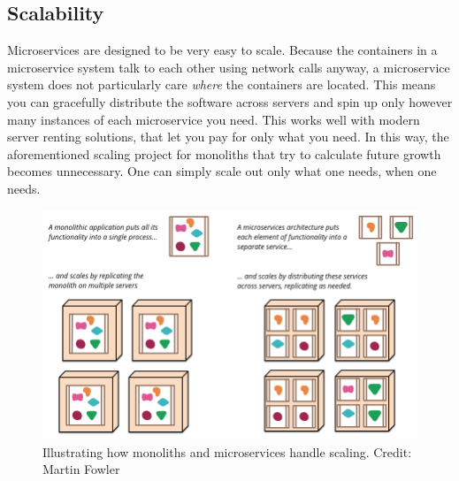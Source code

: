\subsection{Scalability}
Microservices are designed to be very easy to scale. 
Because the containers in a microservice system talk to each other using network calls anyway, a microservice system does not particularly care \textit{where} the containers are located.
This means you can gracefully distribute the software across servers and spin up only however many instances of each microservice you need.
This works well with modern server renting solutions, that let you pay for only what you need. 
In this way, the aforementioned scaling project for monoliths that try to calculate future growth becomes unnecessary. 
One can simply scale out only what one needs, when one needs.

\begin{figure}[ht] 
    \centering 
    \includegraphics[width=\columnwidth]{Figures/scaling.png}
    \caption{Illustrating how monoliths and microservices handle scaling. Credit: Martin Fowler \cite*{Fowler2014}}
    \label{Scaling-comparison}
\end{figure}

